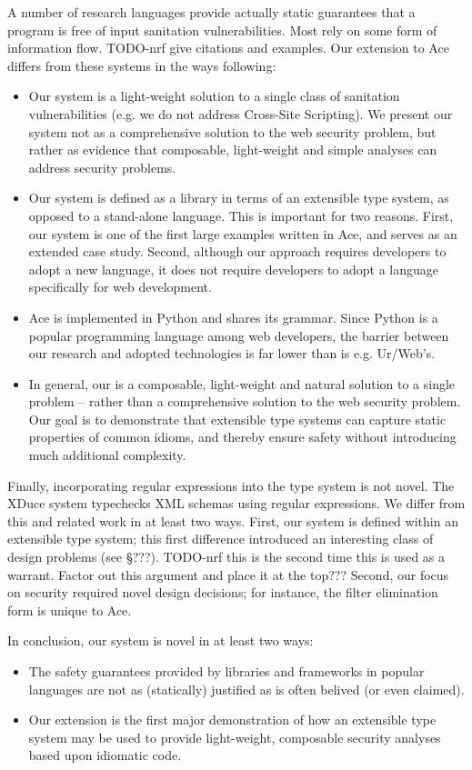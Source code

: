 \documentclass{acm_proc_article-sp}
\theoremstyle{definition}
\begin{document}
A number of research languages provide actually static guarantees that a program
is free of input sanitation vulnerabilities. Most rely on some form of information
flow. TODO-nrf  give citations and examples. Our extension to Ace differs from
these systems in the ways following:
\begin{itemize}
  \item Our system is a light-weight solution to a single class of sanitation
  vulnerabilities (e.g. we do not address Cross-Site Scripting). We present our
  system not as a comprehensive solution to the web security problem, but rather as
  evidence that composable, light-weight and simple analyses can address security
  problems.
  \item Our system is defined as a library in terms of an extensible type system,
  as opposed to a stand-alone language. This is important for two reasons.
  First, our system is one of the first large examples written in Ace, and serves
  as an extended case study. Second, although our approach requires
  developers to adopt a new language, it does not require developers to adopt
  a language specifically for web development.
  \item Ace is implemented in Python and shares its grammar. Since Python is a 
  popular programming language among web developers, the barrier between our research
  and adopted technologies is far lower than is e.g. Ur/Web's.
  \item In general, our is a composable, light-weight and
  natural solution to a single problem -- rather than a comprehensive 
  solution to the web security problem. Our goal is to demonstrate that extensible
  type systems can capture static properties of common idioms, and thereby ensure
  safety without introducing much additional complexity.
\end{itemize}

Finally, incorporating regular expressions into the type system is not novel.
The XDuce system \cite{pierce} typechecks XML schemas using regular expressions.
We differ from this and related work in at least two ways.
First, our system  is defined within an extensible type system;
this first difference introduced an interesting class of design problems (see \S ???).
TODO-nrf this is the second time this is used as a warrant. Factor out this argument
and place it at the top???
Second, our focus on security required novel design decisions; for instance, the
filter elimination form is unique to Ace.

In conclusion, our system is novel in at least two ways:
\begin{itemize}
\item The safety guarantees provided by libraries and frameworks in popular languages
are not as (statically) justified as is often belived (or even claimed).
\item Our extension is the first major demonstration of how an extensible type
system may be used to provide light-weight, composable security analyses based upon
idiomatic code.
\end{itemize}
\end{document}
